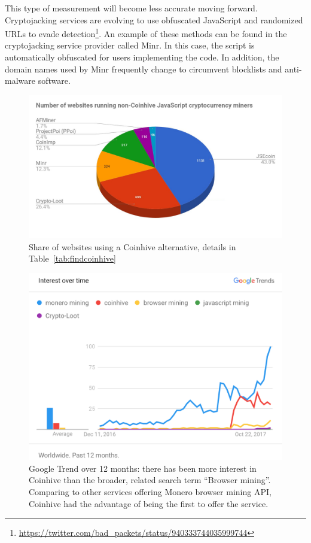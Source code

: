 
This type of measurement will become less accurate moving forward. Cryptojacking services are evolving to use obfuscated JavaScript and randomized URLs to evade detection\footnote{\url{https://twitter.com/bad_packets/status/940333744035999744}}. An example of these methods can be found in the cryptojacking service provider called Minr. In this case, the script is automatically obfuscated for users implementing the code. In addition, the domain names used by Minr frequently change to circumvent blocklists and anti-malware software.


\begin{figure}[t]
\centering
\includegraphics[width=0.9\linewidth]{figures/non-coinhive-miners-pie.png}
\caption[Coinhive Alternatives Market Shares]{Share of websites using a Coinhive alternative, details in Table~\ref{tab:findcoinhive} } \label{fig:copycat}
\end{figure}


\begin{figure}[t]
\centering
\includegraphics[width=0.9\linewidth]{figures/usage_over_time2.png}
\caption[Google Trend Over 12 Months]{Google Trend over 12 months: there has been more interest in Coinhive than the broader, related search term ``Browser mining''. Comparing to other services offering Monero browser mining API, Coinhive had the advantage of being the first to offer the service. \label{fig:trend}}
\end{figure}



